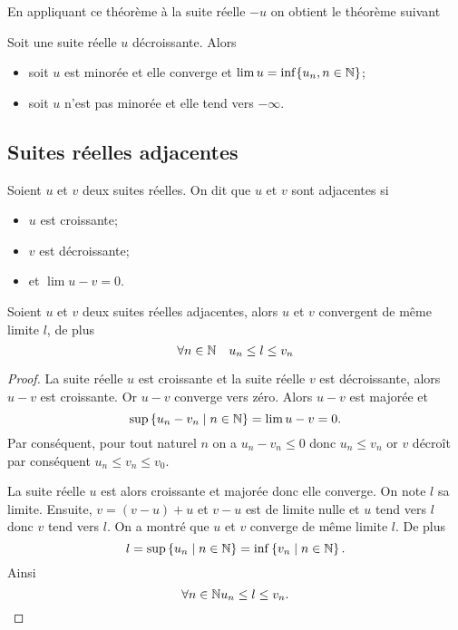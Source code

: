 En appliquant ce théorème à la suite réelle $-u$ on obtient le théorème suivant
\begin{theo}
  Soit une suite réelle $u$ décroissante. Alors
  \begin{itemize}
  \item soit $u$ est minorée et elle converge et $\lim u = \inf\{u_n, n \in \mathbb{N}\}$;
  \item soit $u$ n'est pas minorée et elle tend vers $-\infty$.
  \end{itemize}
\end{theo}

\subsection{Suites réelles adjacentes}

\begin{defdef}
  Soient $u$ et $v$ deux suites réelles. On dit que $u$ et $v$ sont adjacentes si
  \begin{itemize}
  \item $u$ est croissante;
  \item $v$ est décroissante;
  \item et $\lim u-v =0$.
  \end{itemize}
\end{defdef}
\begin{prop}
  Soient $u$ et $v$ deux suites réelles adjacentes, alors $u$ et $v$ convergent de même limite $l$, de plus
  \begin{equation}
    \forall n \in \mathbb{N} \quad u_n \leq l \leq v_n
  \end{equation}
\end{prop}
\begin{proof}
  La suite réelle $u$ est croissante et la suite réelle $v$ est décroissante, alors $u-v$ est croissante. Or $u-v$ converge vers zéro. Alors $u-v$ est majorée et
  \begin{equation}
    \sup\left\{u_n-v_n\mathrel{}\middle|\mathrel{}n \in \mathbb{N}\right\}=\lim u-v=0.
  \end{equation}
Par conséquent, pour tout naturel $n$ on a $u_n-v_n \leq 0$ donc $u_n \leq v_n$ or $v$ décroît par conséquent $u_n \leq v_n \leq v_0$.

La suite réelle $u$ est alors croissante et majorée donc elle converge. On note $l$ sa limite. Ensuite, $v=(v-u)+u$ et $v-u$ est de limite nulle et $u$ tend vers $l$ donc $v$ tend vers $l$. On a montré que $u$ et $v$ converge de même limite $l$. De plus
\begin{equation}
  l=\sup\left\{u_n\mathrel{}\middle|\mathrel{}n\in \mathbb{N}\right\}=\inf\left\{v_n\mathrel{}\middle|\mathrel{}n\in \mathbb{N}\right\}.
\end{equation}
Ainsi
\begin{equation}
  \forall n \in \mathbb{N} u_n \leq l \leq v_n.
\end{equation}
\end{proof}

